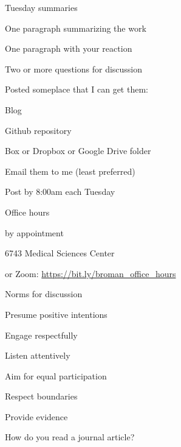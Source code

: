 \documentclass[aspectratio=169,12pt,t]{beamer}
\begin{document}
\begin{frame}{Tuesday summaries}

  \bbi
\item One paragraph summarizing the work
\item One paragraph with your reaction
\item Two or more questions for discussion
\item Posted someplace that I can get them:
  \bi
\item Blog
\item Github repository
\item Box or Dropbox or Google Drive folder
\item Email them to me (least preferred)
  \ei
\item Post by 8:00am each Tuesday
\ei

\end{frame}


\begin{frame}{Office hours}

  \bbi
\item {\hilit by appointment}
\item 6743 Medical Sciences Center
\item or Zoom: \url{https://bit.ly/broman_office_hours}
\ei

\end{frame}






\begin{frame}{Norms for discussion}

      \bbi
    \item Presume positive intentions
    \item Engage respectfully
    \item Listen attentively
    \item Aim for equal participation
    \item Respect boundaries
    \item Provide evidence
      \ei

\end{frame}




\begin{frame}[c]{}

\centerline{\Large \color{title} How do you read a journal article?}

\end{frame}
\end{document}

